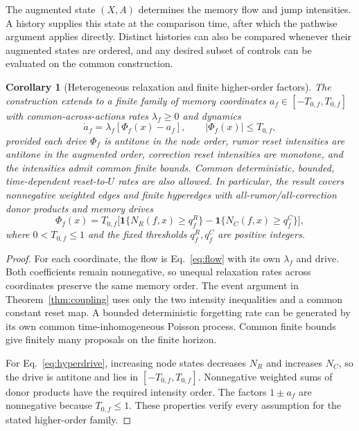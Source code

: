 \documentclass[final,5p,times,twocolumn,sort&compress]{elsarticle}
\theoremstyle{plain}
\newtheorem{corollary}[theorem]{Corollary}
\newcommand{\ind}{\mathbf{1}}
\begin{document}
The augmented state $(X,A)$ determines the memory flow and jump intensities. A history supplies this state at the comparison time, after which the pathwise argument applies directly. Distinct histories can also be compared whenever their augmented states are ordered, and any desired subset of controls can be evaluated on the common construction.

\begin{corollary}[Heterogeneous relaxation and finite higher-order factors]
\label{cor:general}
The construction extends to a finite family of memory coordinates $a_f\in[-T_{0,f},T_{0,f}]$ with common-across-actions rates $\lambda_f\ge0$ and dynamics
\begin{equation}
 \dot a_f=\lambda_f[\Phi_f(x)-a_f],\qquad
 |\Phi_f(x)|\le T_{0,f},\label{eq:generalflow}
\end{equation}
provided each drive $\Phi_f$ is antitone in the node order, rumor reset intensities are antitone in the augmented order, correction reset intensities are monotone, and the intensities admit common finite bounds. Common deterministic, bounded, time-dependent reset-to-$U$ rates are also allowed. In particular, the result covers nonnegative weighted edges and finite hyperedges with all-rumor/all-correction donor products and memory drives
\begin{equation}
 \Phi_f(x)=T_{0,f}\big[\ind\{N_R(f,x)\ge q_f^R\}
              -\ind\{N_C(f,x)\ge q_f^C\}\big],\label{eq:hyperdrive}
\end{equation}
where $0<T_{0,f}\le1$ and the fixed thresholds $q_f^R,q_f^C$ are positive integers.
\end{corollary}
\begin{proof}
For each coordinate, the flow is Eq.~\ref{eq:flow} with its own $\lambda_f$ and drive. Both coefficients remain nonnegative, so unequal relaxation rates across coordinates preserve the same memory order. The event argument in Theorem~\ref{thm:coupling} uses only the two intensity inequalities and a common constant reset map. A bounded deterministic forgetting rate can be generated by its own common time-inhomogeneous Poisson process. Common finite bounds give finitely many proposals on the finite horizon.

For Eq.~\ref{eq:hyperdrive}, increasing node states decreases $N_R$ and increases $N_C$, so the drive is antitone and lies in $[-T_{0,f},T_{0,f}]$. Nonnegative weighted sums of donor products have the required intensity order. The factors $1\pm a_f$ are nonnegative because $T_{0,f}\le1$. These properties verify every assumption for the stated higher-order family.
\end{proof}
\end{document}
